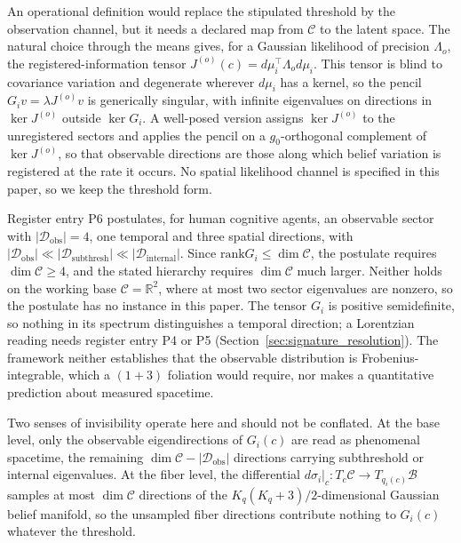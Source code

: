 An operational definition would replace the stipulated threshold by the observation channel, but it needs a declared map from $\mathcal{C}$ to the latent space. The natural choice through the means gives, for a Gaussian likelihood of precision $\Lambda_o$, the registered-information tensor $J^{(o)}(c) = d\mu_i^\top \Lambda_o d\mu_i$. This tensor is blind to covariance variation and degenerate wherever $d\mu_i$ has a kernel, so the pencil $G_i v = \lambda J^{(o)} v$ is generically singular, with infinite eigenvalues on directions in $\ker J^{(o)}$ outside $\ker G_i$. A well-posed version assigns $\ker J^{(o)}$ to the unregistered sectors and applies the pencil on a $g_0$-orthogonal complement of $\ker J^{(o)}$, so that observable directions are those along which belief variation is registered at the rate it occurs. No spatial likelihood channel is specified in this paper, so we keep the threshold form.

Register entry P6 postulates, for human cognitive agents, an observable sector with $|\mathcal{D}_{\text{obs}}| = 4$, one temporal and three spatial directions, with $|\mathcal{D}_{\text{obs}}| \ll |\mathcal{D}_{\text{subthresh}}| \ll |\mathcal{D}_{\text{internal}}|$. Since $\mathrm{rank} G_i \le \dim\mathcal{C}$, the postulate requires $\dim\mathcal{C} \ge 4$, and the stated hierarchy requires $\dim\mathcal{C}$ much larger. Neither holds on the working base $\mathcal{C} = \mathbb{R}^2$, where at most two sector eigenvalues are nonzero, so the postulate has no instance in this paper. The tensor $G_i$ is positive semidefinite, so nothing in its spectrum distinguishes a temporal direction; a Lorentzian reading needs register entry P4 or P5 (Section~\ref{sec:signature_resolution}). The framework neither establishes that the observable distribution is Frobenius-integrable, which a $(1+3)$ foliation would require, nor makes a quantitative prediction about measured spacetime.

Two senses of invisibility operate here and should not be conflated. At the base level, only the observable eigendirections of $G_i(c)$ are read as phenomenal spacetime, the remaining $\dim\mathcal{C} - |\mathcal{D}_{\text{obs}}|$ directions carrying subthreshold or internal eigenvalues. At the fiber level, the differential $d\sigma_i|_c: T_c\mathcal{C} \to T_{q_i(c)}\mathcal{B}$ samples at most $\dim\mathcal{C}$ directions of the $K_q(K_q+3)/2$-dimensional Gaussian belief manifold, so the unsampled fiber directions contribute nothing to $G_i(c)$ whatever the threshold.

